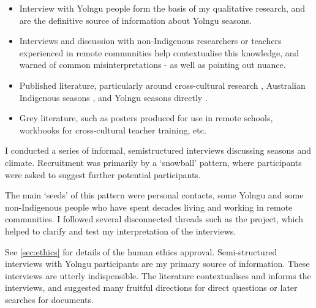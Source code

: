 \begin{itemize}
\item Interview with Yolngu people form the basis of my qualitative research, and
        are the definitive source of information about Yolngu seasons.
\item Interviews and discussion with non-Indigenous researchers or teachers experienced
        in remote communities help contextualise this knowledge, and warned of
        common misinterpretations - as well as pointing out nuance.
\item Published literature, particularly around cross-cultural research \citep[eg.][]{smith1999},
        Australian Indigenous seasons \citep[eg.][]{prober2011,oconnor2010}, and Yolngu
        seasons directly \citep{davis1989}.
\item Grey literature, such as posters produced for use in remote schools, workbooks
        for cross-cultural teacher training, etc.
\end{itemize}


I conducted a series of informal, semistructured interviews discussing
seasons and climate. Recruitment was primarily by a `snowball' pattern,
where participants were asked to suggest further potential participants.

The main `seeds' of this pattern were personal contacts, some Yolngu and some
non-Indigenous people who have spent decades living and working in remote
communities. I followed several disconnected threads such as the
\citet{CSIROcals} project, which helped to clarify and test my interpretation
of the interviews.

See \autoref{sec:ethics} for details of the human ethics approval.
Semi-structured interviews with Yolngu participants are my primary source
of information.  These interviews are utterly indispensible.
The literature contextualises and informs the interviews, and suggested many fruitful
directions for direct questions or later searches for documents.

